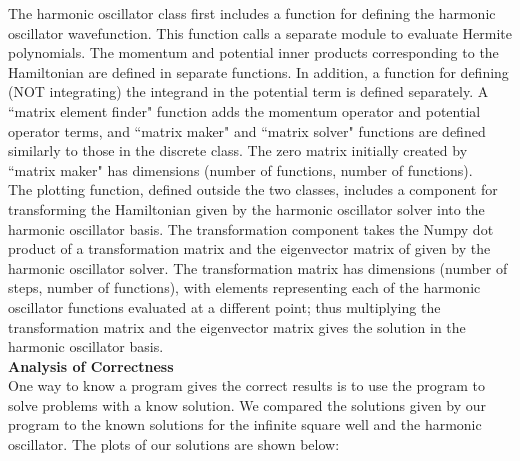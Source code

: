 \documentclass[%
 reprint,
 amsmath,amssymb,
 aps,
]{revtex4-1}
\begin{document}
\noindent The harmonic oscillator class first includes a function for defining the harmonic oscillator wavefunction.  This function calls a separate module to evaluate Hermite polynomials.  The momentum and potential inner products corresponding to the Hamiltonian are defined in separate functions.  In addition, a function for defining (NOT integrating) the integrand in the potential term is defined separately.  A ``matrix element finder" function adds the momentum operator and potential operator terms, and ``matrix maker" and ``matrix solver" functions are defined similarly to those in the discrete class.  The zero matrix initially created by ``matrix maker" has dimensions (number of functions, number of functions).\\

\noindent The plotting function, defined outside the two classes, includes a component for transforming the Hamiltonian given by the harmonic oscillator solver into the harmonic oscillator basis.  The transformation component takes the Numpy dot product of a transformation matrix and the eigenvector matrix of given by the harmonic oscillator solver.  The transformation matrix has dimensions (number of steps, number of functions), with elements representing each of the harmonic oscillator functions evaluated at a different point; thus multiplying the transformation matrix and the eigenvector matrix gives the solution in the harmonic oscillator basis.\\

\noindent \textbf{Analysis of Correctness}\\

\noindent One way to know a program gives the correct results is to use the program to solve problems with a know solution.  We compared the solutions given by our program to the known solutions for the infinite square well and the harmonic oscillator.  The plots of our solutions are shown below:
\end{document}
